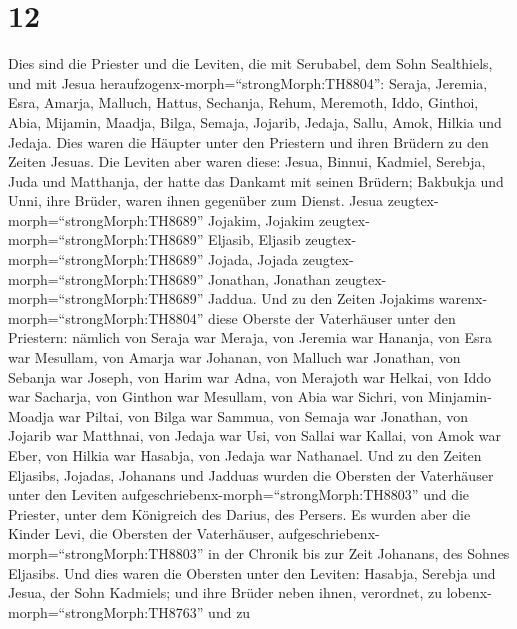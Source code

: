 \hypertarget{section-11}{%
\section{12}\label{section-11}}

 Dies sind die Priester und die Leviten, die mit Serubabel,
dem Sohn Sealthiels, und mit Jesua
heraufzogenx-morph=``strongMorph:TH8804'': Seraja, Jeremia, Esra,
 Amarja, Malluch, Hattus,  Sechanja, Rehum,
Meremoth,  Iddo, Ginthoi, Abia,  Mijamin,
Maadja, Bilga,  Semaja, Jojarib, Jedaja,  Sallu,
Amok, Hilkia und Jedaja. Dies waren die Häupter unter den Priestern und
ihren Brüdern zu den Zeiten Jesuas.  Die Leviten aber waren
diese: Jesua, Binnui, Kadmiel, Serebja, Juda und Matthanja, der hatte
das Dankamt mit seinen Brüdern;  Bakbukja und Unni, ihre
Brüder, waren ihnen gegenüber zum Dienst.  Jesua
zeugtex-morph=``strongMorph:TH8689'' Jojakim, Jojakim
zeugtex-morph=``strongMorph:TH8689'' Eljasib, Eljasib
zeugtex-morph=``strongMorph:TH8689'' Jojada,  Jojada
zeugtex-morph=``strongMorph:TH8689'' Jonathan, Jonathan
zeugtex-morph=``strongMorph:TH8689'' Jaddua.  Und zu den
Zeiten Jojakims warenx-morph=``strongMorph:TH8804'' diese Oberste der
Vaterhäuser unter den Priestern: nämlich von Seraja war Meraja, von
Jeremia war Hananja,  von Esra war Mesullam, von Amarja war
Johanan,  von Malluch war Jonathan, von Sebanja war Joseph,
 von Harim war Adna, von Merajoth war Helkai, 
von Iddo war Sacharja, von Ginthon war Mesullam,  von Abia
war Sichri, von Minjamin-Moadja war Piltai,  von Bilga war
Sammua, von Semaja war Jonathan,  von Jojarib war Matthnai,
von Jedaja war Usi,  von Sallai war Kallai, von Amok war
Eber,  von Hilkia war Hasabja, von Jedaja war Nathanael.
 Und zu den Zeiten Eljasibs, Jojadas, Johanans und Jadduas
wurden die Obersten der Vaterhäuser unter den Leviten
aufgeschriebenx-morph=``strongMorph:TH8803'' und die Priester, unter dem
Königreich des Darius, des Persers.  Es wurden aber die
Kinder Levi, die Obersten der Vaterhäuser,
aufgeschriebenx-morph=``strongMorph:TH8803'' in der Chronik bis zur Zeit
Johanans, des Sohnes Eljasibs.  Und dies waren die Obersten
unter den Leviten: Hasabja, Serebja und Jesua, der Sohn Kadmiels; und
ihre Brüder neben ihnen, verordnet, zu
lobenx-morph=``strongMorph:TH8763'' und zu
